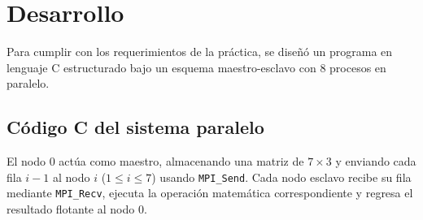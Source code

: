 \section{Desarrollo}

Para cumplir con los requerimientos de la práctica, se diseñó un programa en lenguaje C estructurado bajo un esquema maestro-esclavo con 8 procesos en paralelo.

\subsection{Código C del sistema paralelo}
El nodo 0 actúa como maestro, almacenando una matriz de $7 \times 3$ y enviando cada fila $i-1$ al nodo $i$ ($1 \le i \le 7$) usando \texttt{MPI\_Send}. Cada nodo esclavo recibe su fila mediante \texttt{MPI\_Recv}, ejecuta la operación matemática correspondiente y regresa el resultado flotante al nodo 0.

